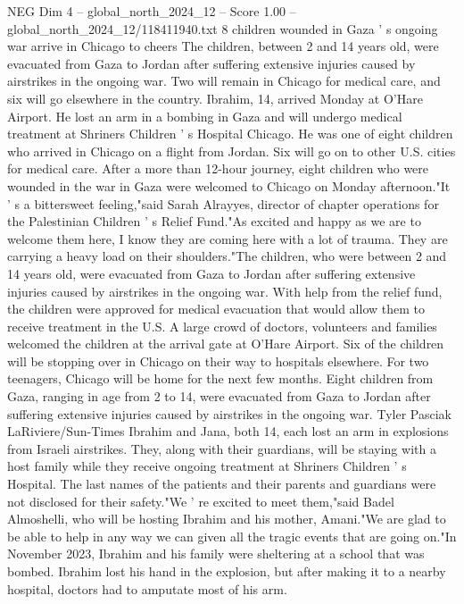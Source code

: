 \begin{textsample}{NEG Dim 4 – global\_north\_2024\_12 – Score 1.00 – global\_north\_2024\_12/118411940.txt}  \label{ex:f4_neg_137}
8 children wounded in Gaza ' s ongoing war arrive in Chicago to cheers The children, between 2 and 14 years old, were evacuated from Gaza to Jordan after suffering extensive injuries caused by airstrikes in the ongoing war.
Two will remain in Chicago for medical care, and six will go elsewhere in the country.
Ibrahim, 14, arrived Monday at O'Hare Airport.
He lost an arm in a bombing in Gaza and will undergo medical treatment at Shriners Children ' s Hospital Chicago.
He was one of eight children who arrived in Chicago on a flight from Jordan.
Six will go on to other U.S. cities for medical care.
After a more than 12-hour journey, eight children who were wounded in the war in Gaza were welcomed to Chicago on Monday afternoon."It ' s a bittersweet feeling,"said Sarah Alrayyes, director of chapter operations for the Palestinian Children ' s Relief Fund."As excited and happy as we are to welcome them here, I know they are coming here with a lot of trauma.
They are carrying a heavy load on their shoulders."The children, who were between 2 and 14 years old, were evacuated from Gaza to Jordan after suffering extensive injuries caused by airstrikes in the ongoing war.
With help from the relief fund, the children were approved for medical evacuation that would allow them to receive treatment in the U.S.
A large crowd of doctors, volunteers and families welcomed the children at the arrival gate at O'Hare Airport.
Six of the children will be stopping over in Chicago on their way to hospitals elsewhere.
For two teenagers, Chicago will be home for the next few months.
Eight children from Gaza, ranging in age from 2 to 14, were evacuated from Gaza to Jordan after suffering extensive injuries caused by airstrikes in the ongoing war.
Tyler Pasciak LaRiviere/Sun-Times Ibrahim and Jana, both 14, each lost an arm in explosions from Israeli airstrikes.
They, along with their guardians, will be staying with a host family while they receive ongoing treatment at Shriners Children ' s Hospital.
The last names of the patients and their parents and guardians were not disclosed for their safety."We ' re excited to meet them,"said Badel Almoshelli, who will be hosting Ibrahim and his mother, Amani."We are glad to be able to help in any way we can given all the tragic events that are going on."In November 2023, Ibrahim and his family were sheltering at a school that was bombed.
Ibrahim lost his hand in the explosion, but after making it to a nearby hospital, doctors had to amputate most of his arm.

\end{textsample}
